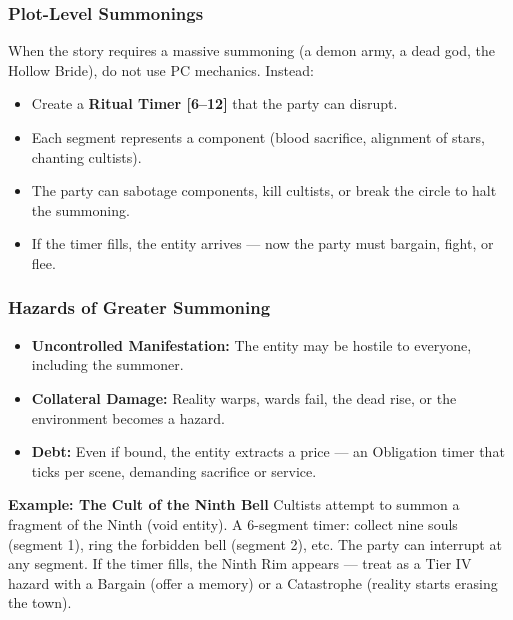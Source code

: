 \subsubsection{Plot-Level Summonings}
When the story requires a massive summoning (a demon army, a dead god, the Hollow Bride), do not use PC mechanics. Instead:
\begin{itemize}
  \item Create a \textbf{Ritual Timer [6--12]} that the party can disrupt.
  \item Each segment represents a component (blood sacrifice, alignment of stars, chanting cultists).
  \item The party can sabotage components, kill cultists, or break the circle to halt the summoning.
  \item If the timer fills, the entity arrives --- now the party must bargain, fight, or flee.
\end{itemize}

\subsubsection{Hazards of Greater Summoning}
\begin{itemize}
  \item \textbf{Uncontrolled Manifestation:} The entity may be hostile to everyone, including the summoner.
  \item \textbf{Collateral Damage:} Reality warps, wards fail, the dead rise, or the environment becomes a hazard.
  \item \textbf{Debt:} Even if bound, the entity extracts a price --- an Obligation timer that ticks per scene, demanding sacrifice or service.
\end{itemize}

\textbf{Example: The Cult of the Ninth Bell}
Cultists attempt to summon a fragment of the Ninth (void entity). A 6-segment timer: collect nine souls (segment 1), ring the forbidden bell (segment 2), etc. The party can interrupt at any segment. If the timer fills, the Ninth Rim appears --- treat as a Tier IV hazard with a Bargain (offer a memory) or a Catastrophe (reality starts erasing the town).

